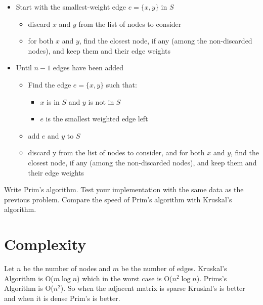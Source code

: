 \begin{itemize}


\item Start with the smallest-weight edge $e = \{x, y\}$ in $S$

\begin{itemize}

\item discard $x$ and $y$ from the list of nodes to consider

\item for both $x$ and $y$, find the closest node, if any (among the non-discarded nodes), and keep them and their edge weights

\end{itemize}

\item Until $n-1$ edges have been added

\begin{itemize}

\item Find the edge $e = \{x, y\}$ such that:

\begin{itemize}

\item $x$ is in $S$ and $y$ is not in $S$

\item $e$ is the smallest weighted edge left

\end{itemize}

\item add $e$ and $y$ to $S$

\item discard y from the list of nodes to consider, and for both $x$ and $y$, find the closest node, if any (among the non-discarded nodes), and keep them and their edge weights

\end{itemize}

\end{itemize}

\begin{problem}
Write Prim's algorithm.
Test your implementation with the same data as the previous problem.
Compare the speed of Prim's algorithm with Kruskal's algorithm. 
\end{problem}

\section*{Complexity}

Let $n$ be the number of nodes and $m$ be the number of edges.
Kruskal's Algorithm is O($m\log{n}$) which in the worst case is O($n^2\log{n}$).
Prims's Algorithm is O($n^2$).
So when the adjacent matrix is sparse Kruskal's is better and when it is dense Prim's is better. 